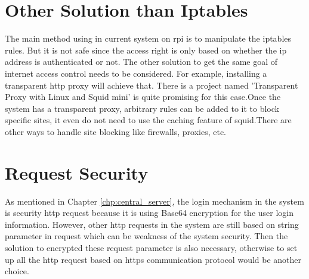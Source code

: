 \section{Other Solution than Iptables}
\par The main method using in current system on \gls{rpi} is to manipulate the iptables rules. But it is not safe since the access right is only based on whether the \gls{ip} address is authenticated or not. The other solution to get the same goal of internet access control needs to be considered. For example, installing a transparent \gls{http} proxy will achieve that. There is a project named 'Transparent Proxy with Linux and Squid mini'\cite{transparentproxy} is quite promising for this case.Once the system has a transparent proxy, arbitrary rules can be added to it to block specific sites, it even do not need to use the caching feature of squid.There are other ways to handle site blocking like firewalls, proxies, etc.

\section{Request Security}
\par As mentioned in Chapter \ref{chp:central_server}, the login mechanism in the system is security \gls{http} request because it is using Base64 encryption for the user login information. However, other \gls{http} requests in the system are still based on string parameter in request which can be weakness of the system security. Then the solution to encrypted these request parameter is also necessary, otherwise to set up all the \gls{http} request based on \gls{https} communication protocol would be another choice.